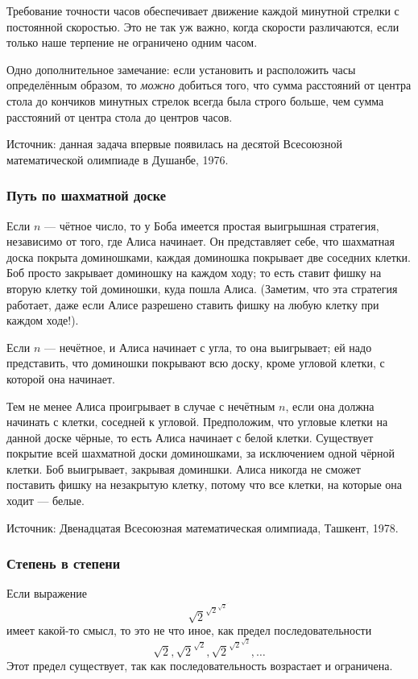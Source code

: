 Требование точности часов обеспечивает движение каждой минутной стрелки с постоянной скоростью.
Это не так уж важно, когда скорости различаются, если только наше терпение не ограничено одним часом.

Одно дополнительное замечание: если установить и расположить часы определённым образом,
то \emph{можно} добиться того, что сумма расстояний от центра стола до кончиков минутных стрелок всегда была строго больше, чем сумма расстояний от центра стола до центров часов.

\medskip

Источник: данная задача впервые появилась на десятой Всесоюзной математической олимпиаде в Душанбе, 1976.

\subsubsection*{Путь по шахматной доске} %

Если $n$ --- чётное число, то у Боба имеется простая выигрышная стратегия, независимо от того, где Алиса начинает.
Он представляет себе, что шахматная доска  покрыта доминошками, каждая доминошка покрывает две соседних клетки.
Боб просто закрывает доминошку на каждом ходу; то есть ставит фишку на вторую клетку той доминошки, куда пошла Алиса. 
(Заметим, что эта стратегия работает, даже если Алисе разрешено ставить фишку на любую клетку при каждом ходе!).

Если $n$ --- нечётное, и Алиса начинает с угла, то она выигрывает;
ей надо представить, что доминошки покрывают всю доску, кроме угловой клетки, с которой она начинает.

Тем не менее Алиса проигрывает в случае с нечётным $n$, если она должна начинать с клетки, соседней к угловой.
Предположим, что угловые клетки на данной доске чёрные, то есть Алиса начинает с белой клетки.
Существует покрытие всей шахматной доски доминошками, за исключением одной чёрной клетки.
Боб выигрывает, закрывая доминшки.
Алиса
никогда не сможет поставить фишку на незакрытую клетку, потому что все клетки, на которые она ходит --- белые.\heart

Источник: Двенадцатая Всесоюзная математическая олимпиада, Ташкент, 1978.

\subsubsection*{Степень в степени} %

Если выражение
$${\sqrt{2}}^{{\sqrt{2}}^{{\sqrt{2}}^{{\cdot}^{\cdot^{\cdot}}}}}$$
имеет какой-то смысл, то это не что иное, как предел последовательности
$${\sqrt{2}}, {\sqrt{2}}^{{\sqrt{2}}}, {\sqrt{2}}^{{\sqrt{2}}^{{\sqrt{2}}}},\dots$$
Этот предел существует, так как последовательность возрастает и ограничена.

